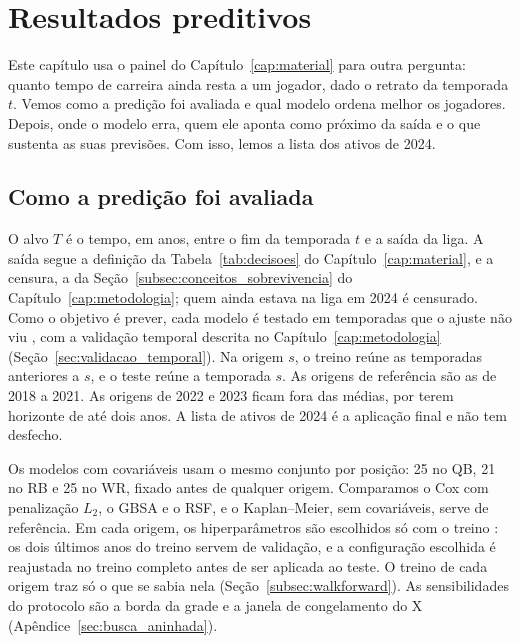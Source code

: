 
\chapter{Resultados preditivos}
\label{cap:resultados_preditivos}

Este capítulo usa o painel do Capítulo~\ref{cap:material} para outra pergunta: quanto tempo de carreira ainda resta a um jogador, dado o retrato da temporada $t$. Vemos como a predição foi avaliada e qual modelo ordena melhor os jogadores. Depois, onde o modelo erra, quem ele aponta como próximo da saída e o que sustenta as suas previsões. Com isso, lemos a lista dos ativos de 2024.

\section{Como a predição foi avaliada}
\label{sec:desenho_aplicado}

O alvo $T$ é o tempo, em anos, entre o fim da temporada $t$ e a saída da liga. A saída segue a definição da Tabela~\ref{tab:decisoes} do Capítulo~\ref{cap:material}, e a censura, a da Seção~\ref{subsec:conceitos_sobrevivencia} do Capítulo~\ref{cap:metodologia}; quem ainda estava na liga em 2024 é censurado. Como o objetivo é prever, cada modelo é testado em temporadas que o ajuste não viu \citep{shmueli2010}, com a validação temporal descrita no Capítulo~\ref{cap:metodologia} (Seção~\ref{sec:validacao_temporal}). Na origem $s$, o treino reúne as temporadas anteriores a $s$, e o teste reúne a temporada $s$. As origens de referência são as de 2018 a 2021. As origens de 2022 e 2023 ficam fora das médias, por terem horizonte de até dois anos. A lista de ativos de 2024 é a aplicação final e não tem desfecho.

Os modelos com covariáveis usam o mesmo conjunto por posição: 25 no QB, 21 no RB e 25 no WR, fixado antes de qualquer origem. Comparamos o Cox com penalização $L_2$, o GBSA e o RSF, e o Kaplan--Meier, sem covariáveis, serve de referência. Em cada origem, os hiperparâmetros são escolhidos só com o treino \citep{varma2006,cawley2010}: os dois últimos anos do treino servem de validação, e a configuração escolhida é reajustada no treino completo antes de ser aplicada ao teste. O treino de cada origem traz só o que se sabia nela (Seção~\ref{subsec:walkforward}). As sensibilidades do protocolo são a borda da grade e a janela de congelamento do X (Apêndice~\ref{sec:busca_aninhada}).

